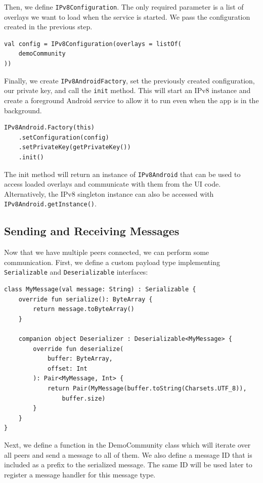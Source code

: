 Then, we define \texttt{IPv8Configuration}. The only required parameter is a list of overlays we want to load when the service is started. We pass the configuration created in the previous step.

\begin{verbatim}
val config = IPv8Configuration(overlays = listOf(
    demoCommunity
))
\end{verbatim}

Finally, we create \texttt{IPv8AndroidFactory}, set the previously created configuration, our private key, and call the \texttt{init} method. This will start an IPv8 instance and create a foreground Android service to allow it to run even when the app is in the background.

\begin{verbatim}
IPv8Android.Factory(this)
    .setConfiguration(config)
    .setPrivateKey(getPrivateKey())
    .init()
\end{verbatim}

The init method will return an instance of \texttt{IPv8Android} that can be used to access loaded overlays and communicate with them from the UI code. Alternatively, the IPv8 singleton instance can also be accessed with \texttt{IPv8Android.getInstance()}.


\subsection{Sending and Receiving Messages}

Now that we have multiple peers connected, we can perform some communication. First, we define a custom payload type implementing \texttt{Serializable} and \texttt{Deserializable} interfaces:

\begin{verbatim}
class MyMessage(val message: String) : Serializable {
    override fun serialize(): ByteArray {
        return message.toByteArray()
    }

    companion object Deserializer : Deserializable<MyMessage> {
        override fun deserialize(
            buffer: ByteArray,
            offset: Int
        ): Pair<MyMessage, Int> {
            return Pair(MyMessage(buffer.toString(Charsets.UTF_8)),
                buffer.size)
        }
    }
}
\end{verbatim}

Next, we define a function in the DemoCommunity class which will iterate over all peers and send a message to all of them. We also define a message ID that is included as a prefix to the serialized message. The same ID will be used later to register a message handler for this message type.

